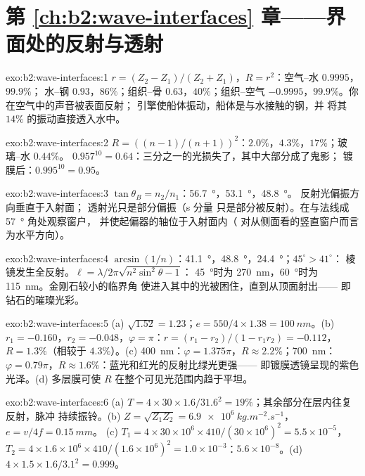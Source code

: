 \section*{第 \ref{ch:b2:wave-interfaces} 章——界面处的反射与透射}

\begin{solution}{exo:b2:wave-interfaces:1}
$r = (Z_2 - Z_1)/(Z_2 + Z_1)$，$R = r^2$：空气–水 $0.9995$，$99.9\%$；
水–钢 $0.93$，$86\%$；组织–骨 $0.63$，$40\%$；组织–空气
$-0.9995$，$99.9\%$。你在空气中的声音被表面反射；
引擎使船体振动，船体是与水接触的钢，并
将其 $14\%$ 的振动直接透入水中。
\end{solution}

\begin{solution}{exo:b2:wave-interfaces:2}
$R = ((n - 1)/(n + 1))^2$：$2.0\%$，$4.3\%$，$17\%$；玻璃–水 $0.44\%$。
$0.957^{10} = 0.64$：三分之一的光损失了，其中大部分成了鬼影；
镀膜后：$0.995^{10} = 0.95$。
\end{solution}

\begin{solution}{exo:b2:wave-interfaces:3}
$\tan\theta_B = n_2/n_1$：\qty{56.7}{\degree}，\qty{53.1}{\degree}，\qty{48.8}{\degree}。
反射光偏振方向垂直于入射面；
透射光只是部分偏振（s 分量
只是部分被反射）。在与法线成 \qty{57}{\degree} 角处观察窗户，
并使起偏器的轴位于入射面内（
对从侧面看的竖直窗户而言为水平方向）。
\end{solution}

\begin{solution}{exo:b2:wave-interfaces:4}
$\arcsin(1/n)$：\qty{41.1}{\degree}，\qty{48.8}{\degree}，\qty{24.4}{\degree}；$45^\circ > 41^\circ$：
棱镜发生全反射。$\ell = \lambda/2\pi\sqrt{n^2\sin^2\theta - 1}$：
\qty{45}{\degree}时为 \qty{270}{nm}，\qty{60}{\degree}时为 \qty{115}{nm}。金刚石较小的临界角
使进入其中的光被困住，直到从顶面射出——
即钻石的璀璨光彩。
\end{solution}

\begin{solution}{exo:b2:wave-interfaces:5}
(a) $\sqrt{1.52} = 1.23$；$e = 550/4 \times 1.38 = \qty{100}{nm}$。(b) $r_1 = -0.160$，$r_2 =
-0.048$，$\varphi = \pi$：$r = (r_1 - r_2)/(1 - r_1r_2) = -0.112$，$R = 1.3\%$（相较于
$4.3\%$）。(c) \qty{400}{nm}：$\varphi = 1.375\pi$，$R \approx 2.2\%$；\qty{700}{nm}：$\varphi =
0.79\pi$，$R \approx 1.6\%$：蓝光和红光的反射比绿光更强——
即镀膜透镜呈现的紫色光泽。(d) 多层膜可使 $R$
在整个可见光范围内趋于平坦。
\end{solution}

\begin{solution}{exo:b2:wave-interfaces:6}
(a) $T = 4 \times 30 \times 1.6/31.6^2 = 19\%$；其余部分在层内往复反射，脉冲
持续振铃。(b) $Z = \sqrt{Z_1Z_2} = \qty{6.9e6}{kg.m^{-2}.s^{-1}}$，$e = v/4f = \qty{0.15}{mm}$。
(c) $T_1 = 4 \times 30 \times 10^6 \times 410/(30 \times 10^6)^2 = 5.5 \times 10^{-5}$，$T_2 = 4 \times 1.6 \times
10^6 \times 410/(1.6 \times 10^6)^2 = 1.0 \times 10^{-3}$：$5.6 \times 10^{-8}$。(d) $4 \times 1.5 \times 1.6/
3.1^2 = 0.999$。
\end{solution}

